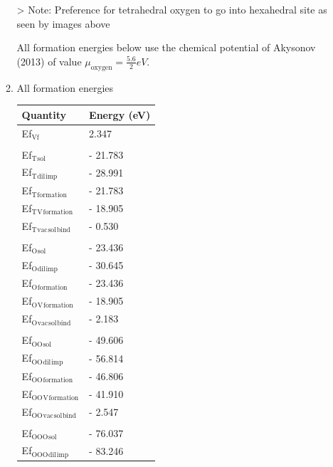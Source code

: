 \documentclass[11pt]{article}
\begin{document}
\begin{enumerate}
\begin{enumerate}
> Note: Preference for tetrahedral oxygen to go into hexahedral site as seen by images above

All formation energies below use the chemical potential of Akysonov
(2013) of value \(\mu_{\text{oxygen}} = \frac{5.6}{ 2} eV\).

\item All formation energies
\label{sec:org7041520}

\begin{center}
\begin{tabular}{ll}
Quantity & Energy (eV)\\
\hline
Ef\(_{\text{Vf}}\) & 2.347\\
 & \\
Ef\(_{\text{T}}\)\(_{\text{sol}}\) & -  21.783\\
Ef\(_{\text{T}}\)\(_{\text{dil}}\)\(_{\text{imp}}\) & -  28.991\\
Ef\(_{\text{T}}\)\(_{\text{formation}}\) & -  21.783\\
Ef\(_{\text{T}}\)\(_{\text{V}}\)\(_{\text{formation}}\) & -  18.905\\
Ef\(_{\text{T}}\)\(_{\text{vac}}\)\(_{\text{sol}}\)\(_{\text{bind}}\) & -   0.530\\
 & \\
Ef\(_{\text{O}}\)\(_{\text{sol}}\) & -  23.436\\
Ef\(_{\text{O}}\)\(_{\text{dil}}\)\(_{\text{imp}}\) & -  30.645\\
Ef\(_{\text{O}}\)\(_{\text{formation}}\) & -  23.436\\
Ef\(_{\text{O}}\)\(_{\text{V}}\)\(_{\text{formation}}\) & -  18.905\\
Ef\(_{\text{O}}\)\(_{\text{vac}}\)\(_{\text{sol}}\)\(_{\text{bind}}\) & -   2.183\\
 & \\
Ef\(_{\text{OO}}\)\(_{\text{sol}}\) & -  49.606\\
Ef\(_{\text{OO}}\)\(_{\text{dil}}\)\(_{\text{imp}}\) & -  56.814\\
Ef\(_{\text{OO}}\)\(_{\text{formation}}\) & -  46.806\\
Ef\(_{\text{OO}}\)\(_{\text{V}}\)\(_{\text{formation}}\) & -  41.910\\
Ef\(_{\text{OO}}\)\(_{\text{vac}}\)\(_{\text{sol}}\)\(_{\text{bind}}\) & -   2.547\\
 & \\
Ef\(_{\text{OOO}}\)\(_{\text{sol}}\) & -  76.037\\
Ef\(_{\text{OOO}}\)\(_{\text{dil}}\)\(_{\text{imp}}\) & -  83.246\\

\end{tabular}
\end{center}
\end{enumerate}
\end{enumerate}
\end{document}
